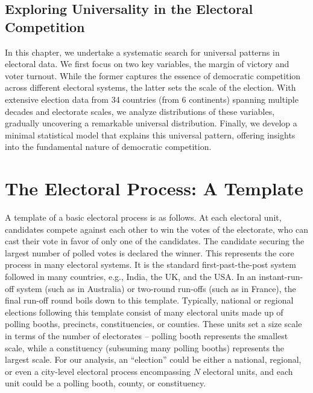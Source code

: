 \subsection{Exploring Universality in the Electoral Competition}

In this chapter, we undertake a systematic search for universal patterns in electoral data. We first focus on two key variables, the margin of victory and voter turnout. While the former captures the essence of democratic competition across different electoral systems, the latter sets the scale of the election. With extensive election data \cite{clea,india_data,canada_data, DVN/VOQCHQ_2018} from 34 countries (from 6 continents) spanning multiple decades and electorate scales, we analyze distributions of these variables, gradually uncovering a remarkable universal distribution. Finally, we develop a minimal statistical model that explains this universal pattern, offering insights into the fundamental nature of democratic competition.

\section{The Electoral Process: A Template}

A template of a basic electoral process is as follows. At each electoral unit, candidates compete against each other to win the votes of the electorate, who can cast their vote in favor of only one of the candidates. The candidate securing the largest number of polled votes is declared the winner. This represents the core process in many electoral systems. It is the standard first-past-the-post system followed in many countries, e.g., India, the UK, and the USA. In an instant-run-off system (such as in Australia) or two-round run-offs (such as in France), the final run-off round boils down to this template. Typically, national or regional elections following this template consist of many electoral units made up of polling booths, precincts, constituencies, or counties. These units set a size scale in terms of the number of electorates -- polling booth represents the smallest scale, while a constituency (subsuming many polling booths) represents the largest scale. For our analysis, an ``election'' could be either a national, regional, or even a city-level electoral process encompassing $N$ electoral units, and each unit could be a polling booth, county, or constituency.


